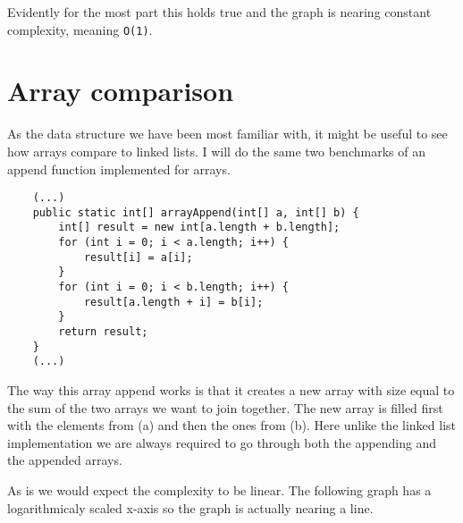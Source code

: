 \documentclass[a4paper,11pt]{article}
\begin{document}
Evidently for the most part this holds true and the graph is nearing constant complexity, meaning {\tt O(1)}.

\section*{Array comparison}

As the data structure we have been most familiar with, it might be useful to see how arrays compare to linked lists. I will do the same two benchmarks of an append function implemented for arrays.

\begin{verbatim}
    (...)
    public static int[] arrayAppend(int[] a, int[] b) {
        int[] result = new int[a.length + b.length];
        for (int i = 0; i < a.length; i++) {
            result[i] = a[i];
        }
        for (int i = 0; i < b.length; i++) {
            result[a.length + i] = b[i];
        }
        return result;
    }
    (...)
\end{verbatim}

The way this array append works is that it creates a new array with size equal to the sum of the two arrays we want to join together. The new array is filled first with the elements from (a) and then the ones from (b). Here unlike the linked list implementation we are always required to go through both the appending and the appended arrays.

As is we would expect the complexity to be linear. The following graph has a logarithmicaly scaled x-axis so the graph is actually nearing a line.
\end{document}
